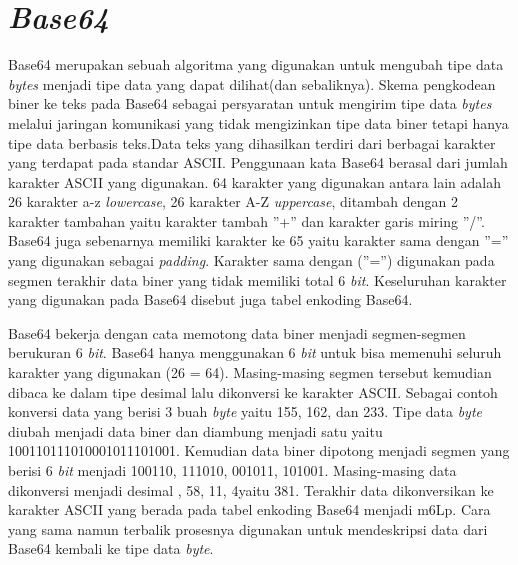 
\section{\textit{Base64}}
\label{sec:base64}

Base64 merupakan sebuah algoritma yang digunakan untuk mengubah tipe data \textit{bytes} menjadi tipe data yang dapat dilihat(dan sebaliknya). Skema pengkodean biner ke teks pada Base64 sebagai persyaratan untuk mengirim tipe data \textit{bytes} melalui jaringan komunikasi yang tidak mengizinkan tipe data biner tetapi hanya tipe data berbasis teks.Data teks yang dihasilkan terdiri dari berbagai karakter yang terdapat pada standar ASCII. Penggunaan kata Base64 berasal dari jumlah karakter ASCII yang digunakan. 64 karakter yang digunakan antara lain adalah 26 karakter a-z \textit{lowercase}, 26 karakter A-Z \textit{uppercase}, ditambah dengan 2 karakter tambahan yaitu karakter tambah ”+” dan karakter garis miring ”/”. Base64 juga sebenarnya memiliki karakter ke 65 yaitu karakter sama dengan ”=” yang digunakan sebagai \textit{padding}. Karakter sama dengan (”=”) digunakan pada segmen terakhir data biner yang tidak memiliki total 6 \textit{bit}. Keseluruhan karakter yang digunakan pada Base64 disebut juga tabel enkoding Base64.

Base64 bekerja dengan cata memotong data biner menjadi segmen-segmen berukuran 6 \textit{bit}. Base64 hanya menggunakan 6 \textit{bit} untuk bisa memenuhi seluruh karakter yang digunakan (26 = 64). Masing-masing segmen tersebut kemudian dibaca ke dalam tipe desimal lalu dikonversi ke karakter ASCII. Sebagai contoh konversi data yang berisi 3 buah \textit{byte} yaitu 155, 162, dan 233. Tipe data \textit{byte} diubah menjadi data biner dan diambung menjadi satu yaitu 100110111010001011101001. Kemudian data biner dipotong menjadi segmen yang berisi 6 \textit{bit} menjadi 100110, 111010, 001011, 101001. Masing-masing data dikonversi menjadi desimal , 58, 11, 4yaitu 381. Terakhir data dikonversikan ke karakter ASCII yang berada pada tabel enkoding Base64 menjadi m6Lp. Cara yang sama namun terbalik prosesnya digunakan untuk mendeskripsi data dari Base64 kembali ke tipe data \textit{byte}.

